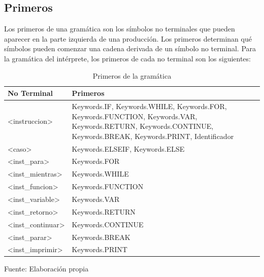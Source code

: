 \subsection{Primeros}
Los primeros de una gramática son los símbolos no terminales que pueden aparecer en la parte izquierda de una producción. Los primeros determinan qué símbolos pueden comenzar una cadena derivada de un símbolo no terminal. Para la gramática del intérprete, los primeros de cada no terminal son los siguientes:
\begin{table}[!h]
  \begin{center}
    \begin{tabularx}{1\textwidth}{|X|X|}
      \hline
      \textbf{No Terminal} & \textbf{Primeros} \\
      \hline
      <instruccion> & Keywords.IF, Keywords.WHILE, Keywords.FOR, Keywords.FUNCTION, Keywords.VAR, Keywords.RETURN, Keywords.CONTINUE, Keywords.BREAK, Keywords.PRINT, Identificador \\
      \hline
      <caso> & Keywords.ELSEIF, Keywords.ELSE \\
      \hline
      <inst\_para> & Keywords.FOR \\
      \hline
      <inst\_mientras> & Keywords.WHILE \\
      \hline
      <inst\_funcion> & Keywords.FUNCTION \\
      \hline
      <inst\_variable> & Keywords.VAR \\
      \hline
      <inst\_retorno> & Keywords.RETURN \\
      \hline
      <inst\_continuar> & Keywords.CONTINUE \\
      \hline
      <inst\_parar> & Keywords.BREAK \\
      \hline
      <inst\_imprimir> & Keywords.PRINT \\
      \hline
    \end{tabularx}
  \end{center}
  \caption{Primeros de la gramática}
  \centering Fuente: Elaboración propia
  \label{tab:primeros}
\end{table}

